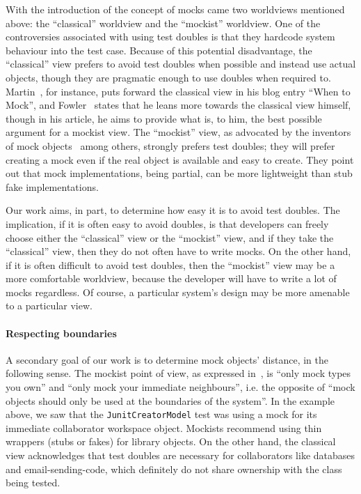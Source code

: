 With the introduction of the concept of mocks came two worldviews mentioned above: the ``classical'' worldview and the ``mockist'' worldview.
One of the controversies associated with using test doubles is that they hardcode system behaviour into the test case. Because of this potential disadvantage, the ``classical'' view prefers to avoid test doubles when possible and instead use actual objects, though they are pragmatic enough to use doubles when required to. Martin~\cite{martin14:_when_mock}, for instance, puts forward the classical view in his blog entry ``When to Mock'', and Fowler~\cite{fowler07:_mocks_arent_stubs} states that he leans more towards the classical view himself, though in his article, he aims to provide what is, to him, the best possible argument for a mockist view. The ``mockist'' view, as advocated by the inventors of mock objects~\cite{freeman04:_mock_roles_objec} among others, strongly prefers test doubles; they will prefer creating a mock even if the real object is available and easy to create. They point out that mock implementations, being partial, can be more lightweight than stub fake implementations.


Our work aims, in part, to determine how easy it is to avoid test doubles. The implication, if it is often easy to avoid doubles, is that developers can freely choose either the ``classical'' view or the ``mockist'' view, and if they take the ``classical'' view, then they do not often have to write mocks. On the other hand, if it is often difficult to avoid test doubles, then the ``mockist'' view may be a more comfortable worldview, because the developer will have to write a lot of mocks regardless. Of course, a particular system's design may be more amenable to a particular view.

\paragraph{Respecting boundaries} A secondary goal of our work is to determine mock objects' distance, in the following sense.
The mockist point of view, as expressed
in~\cite{freeman04:_mock_roles_objec}, is ``only mock types you own'' and ``only mock your immediate
neighbours'', i.e. the opposite of ``mock objects should only be used
at the boundaries of the system''. In the example above, we saw that the
\texttt{JunitCreatorModel} test was using a mock for its immediate collaborator
workspace object. Mockists recommend using thin wrappers (stubs or fakes) for 
library objects. On the other hand, the classical view acknowledges that test doubles
are necessary for collaborators like databases and email-sending-code, which definitely
do not share ownership with the class being tested.

